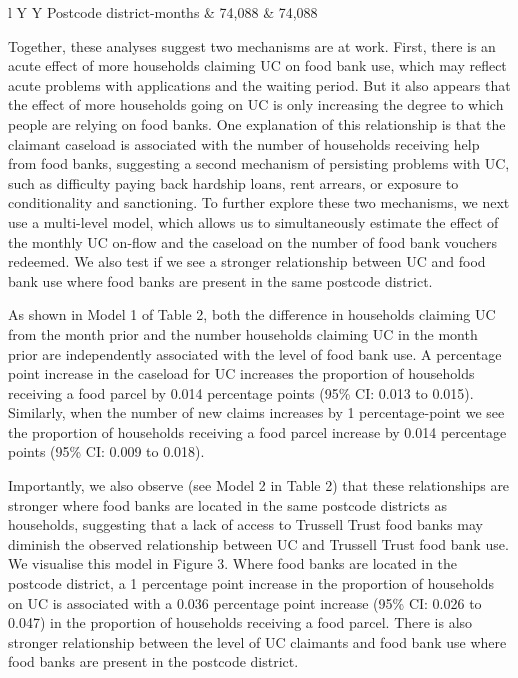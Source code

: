 \documentclass[12pt,article,oneside]{memoir}
\begin{document}
{\begin{tabularx}{\textwidth}{l Y Y}
\hline
Postcode district-months        &       74,088        &       74,088        \\
\hline
\hline
{}
 
\end{tabularx} 
}

Together, these analyses suggest two mechanisms are at work. First, there is an acute effect of more households claiming UC on food bank use, which may reflect acute problems with applications and the waiting period. But it also appears that the effect of more households going on UC is only increasing the degree to which people are relying on food banks. One explanation of this relationship is that the claimant caseload is associated with the number of households receiving help from food banks, suggesting a second mechanism of persisting problems with UC, such as difficulty paying back hardship loans, rent arrears, or exposure to conditionality and sanctioning. To further explore these two mechanisms, we next use a multi-level model, which allows us to simultaneously estimate the effect of the monthly UC on-flow and the caseload on the number of food bank vouchers redeemed. We also test if we see a stronger relationship between UC and food bank use where food banks are present in the same postcode district.

As shown in Model 1 of Table 2, both the difference in households claiming UC from the month prior and the number households claiming UC in the month prior are independently associated with the level of food bank use. A percentage point increase in the caseload for UC increases the proportion of households receiving a food parcel by 0.014 percentage points (95\% CI: 0.013 to 0.015). Similarly, when the number of new claims increases by 1 percentage-point we see the proportion of households receiving a food parcel increase by 0.014 percentage points (95\% CI: 0.009 to 0.018). 

Importantly, we also observe (see Model 2 in Table 2) that these relationships are stronger where food banks are located in the same postcode districts as households, suggesting that a lack of access to Trussell Trust food banks may diminish the observed relationship between UC and Trussell Trust food bank use. We visualise this model in Figure 3. Where food banks are located in the postcode district, a 1 percentage point increase in the proportion of households on UC is associated with a 0.036 percentage point increase (95\% CI: 0.026 to 0.047) in the proportion of households receiving a food parcel. There is also stronger relationship between the level of UC claimants and food bank use where food banks are present in the postcode district.
\end{document}
